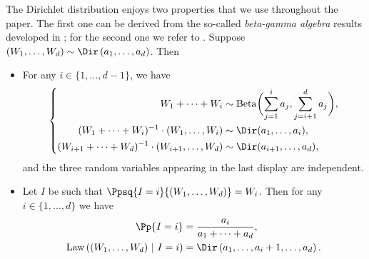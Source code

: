 The Dirichlet distribution enjoys two properties that we use throughout the paper.
The first one can be derived from the so-called \emph{beta-gamma algebra} results developed in \cite{dufresne_algebraic_1998}; for the second one we refer to \cite[Lem.\,17]{addario-berry_critical_2010}.
Suppose $(W_1,\dots,W_d) \sim \Dir \left(a_1, \dots, a_d\right)$.
Then
\begin{itemize}
\item For any $i\in\{1,\dots,d-1\}$, we have
\begin{align}\label{eq:dirichlet distrib factorisation}\left\lbrace
\begin{aligned}
W_1+\dots + W_i &\sim \mathrm{Beta} \biggl( \sum_{j=1}^i a_j, \sum_{j=i+1}^d a_j \biggr), \\
(W_1+\dots + W_i)^{-1}\cdot (W_1,\dots ,W_i) &\sim \Dir(a_1, \dots, a_i),\\
(W_{i+1}+\dots + W_d)^{-1}\cdot (W_{i+1},\dots ,W_d) &\sim \Dir(a_{i+1}, \dots, a_d),
\end{aligned}
\right.
\end{align}
and the three random variables appearing in the last display are independent.
\item Let $I$ be such that $\Ppsq{I=i}{(W_1,\dots,W_d)}=W_i$. Then for any $i\in \{1,\dots,d\}$ we have
\begin{align}\label{eq:dirichlet distrib size-biaising}
\Pp{I=i} &= \frac{a_i}{a_1+\dots+a_d},\\
\mathrm{Law}\left((W_1,\dots,W_d) \ \vert \ I=i \right) &= \Dir \left(a_1, \dots,a_i+1,\dots, a_d\right). \label{eq:dirichlet distrib size-biaising_bis}
\end{align}
\end{itemize}
